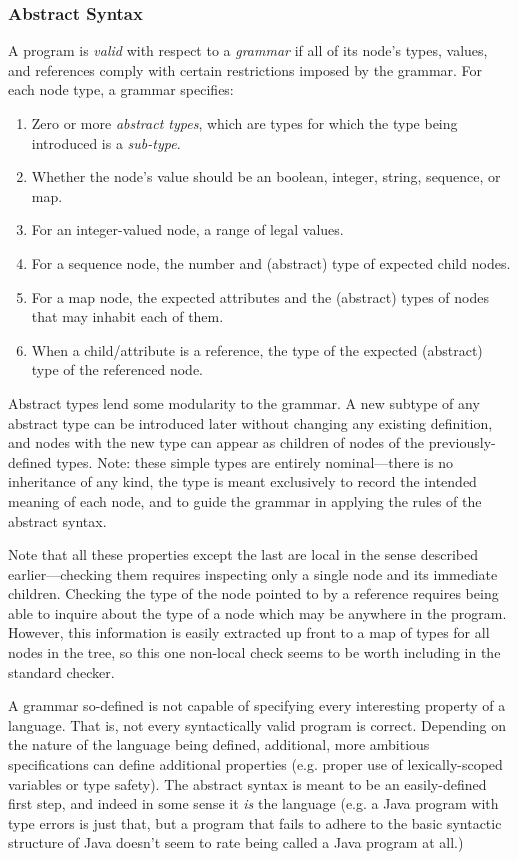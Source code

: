 \subsubsection{Abstract Syntax}
A program is \emph{valid} with respect to a \emph{grammar} if all of its node's types, values, and references comply with certain restrictions imposed by the grammar. For each node type, a grammar specifies:
\begin{enumerate}
\item Zero or more \emph{abstract types}, which are types for which the type being introduced is a \emph{sub-type}.
\item Whether the node's value should be an boolean, integer, string, sequence, or map.
\item For an integer-valued node, a range of legal values.
\item For a sequence node, the number and (abstract) type of expected child nodes.
\item For a map node, the expected attributes and the (abstract) types of nodes that may inhabit each of them.
\item When a child/attribute is a reference, the type of the expected (abstract) type of the referenced node.
\end{enumerate}

Abstract types lend some modularity to the grammar. A new subtype of any abstract type can be introduced later without changing any existing definition, and nodes with the new type can appear as children of nodes of the previously-defined types. Note: these simple types are entirely nominal---there is no inheritance of any kind, the type is meant exclusively to record the intended meaning of each node, and to guide the grammar in applying the rules of the abstract syntax.

Note that all these properties except the last are local in the sense described earlier---checking them requires inspecting only a single node and its immediate children. Checking the type of the node pointed to by a reference requires being able to inquire about the type of a node which may be anywhere in the program. However, this information is easily extracted up front to a map of types for all nodes in the tree, so this one non-local check seems to be worth including in the standard checker.

A grammar so-defined is not capable of specifying every interesting property of a language. That is, not every syntactically valid program is correct. Depending on the nature of the language being defined, additional, more ambitious specifications can define additional properties (e.g. proper use of lexically-scoped variables or type safety). The abstract syntax is meant to be an easily-defined first step, and indeed in some sense it \emph{is} the language (e.g. a Java program with type errors is just that, but a program that fails to adhere to the basic syntactic structure of Java doesn't seem to rate being called a Java program at all.)


